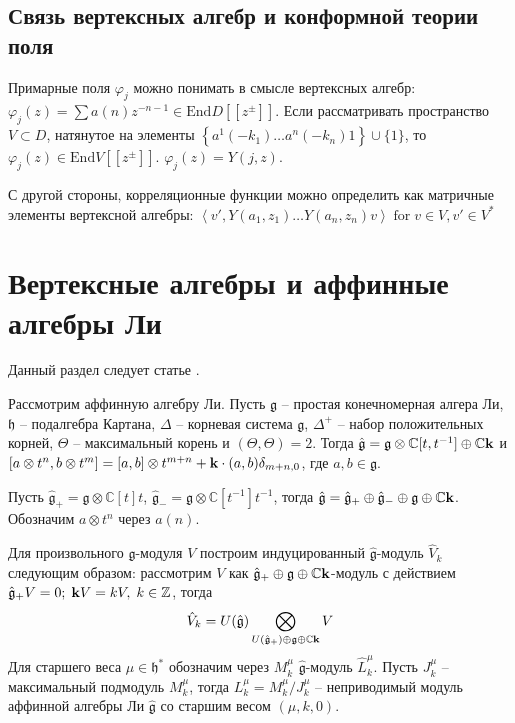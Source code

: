 \documentclass[12pt]{article}
\newcommand{\gf}{\mathfrak{g}}
\newcommand{\hf}{\mathfrak{h}}
\newcommand{\gfh}{\hat{\mathfrak{g}}}
\begin{document}
\subsection{Связь вертексных алгебр и конформной теории поля}
 Примарные поля
$\varphi_j$ можно понимать в смысле вертексных алгебр: $\varphi_j (z)
=  \sum a(n) z^{-n-1} \in \mathrm{End} D [[z^{\pm}]]$. Если
рассматривать пространство $V\subset D$, натянутое на элементы $\left\{a^1
(-k_1) \dots a^n (-k_n) 1 \right\} \cup \{1\}$, то $\varphi_j (z) \in
\mathrm{End} V [[z^{\pm}]]$. 
$\varphi_j (z) = Y(j,z)$.

С другой стороны, корреляционные функции можно определить как
матричные элементы вертексной алгебры: $\left<v',Y(a_1,z_1)\dots
  Y(a_n,z_n) v\right> \;\mbox{for}\; v\in V, v'\in V^*$

\section{Вертексные алгебры и аффинные алгебры Ли}
\label{sec:affine-lie-algebras}
Данный раздел следует статье \cite{frenkel1992vertex}.

Рассмотрим аффинную алгебру Ли. Пусть $\gf$ -- простая конечномерная
алгера Ли, $\hf$ -- подалгебра Картана, $\Delta$ -- корневая система
$\gf$, $\Delta^+$ -- набор положительных корней, $\Theta$ --
максимальный корень и $(\Theta,\Theta)=2$. 
Тогда $\gfh=\gf\otimes \mathbb{C} [t,t^{-1}]\oplus \mathbb{C}{\bf k}$
и $[a\otimes t^n, b\otimes t^m]=[a,b]\otimes t^{m+n} +{\bf k}\cdot
(a,b)\delta_{m+n,0}$, где $a,b\in \gf$. 

Пусть $\gfh_+=\gf\otimes \mathbb{C}[t]t$, $\gfh_- =\gf\otimes
\mathbb{C}[t^{-1}]t^{-1}$, тогда $\gfh=\gfh_+\oplus \gfh_- \oplus \gf\oplus
\mathbb{C}{\bf k}$. 
Обозначим $a\otimes t^n$ через $a(n)$.

Для произвольного $\gf$-модуля $V$ построим индуцированный $\gfh$-модуль $\hat{V}_k$ следующим
образом: рассмотрим $V$ как $\gfh_+ \oplus\gf\oplus \mathbb{C}{\bf k}$-модуль с
действием $\gfh_+ V=0; \; {\bf k} V=k V,\; k\in \mathbb{Z}$, тогда
\begin{equation}
  \label{eq:1}
  \hat{V}_k=U(\gfh) \bigotimes_{U(\gfh_+)\oplus \gf\oplus\mathbb{C}{\bf k}} V
\end{equation}
Для старшего веса $\mu\in \hf^* $ обозначим через $M^{\mu}_{k}$ $\gfh$-модуль
$\hat{L}^{\mu}_k$. Пусть $J^{\mu}_k$ -- максимальный подмодуль $M^{\mu}_k$,
тогда $L^{\mu}_k=M^{\mu}_k/J^{\mu}_k$ -- неприводимый модуль аффинной алгебры Ли
$\gfh$ со старшим весом $(\mu,k,0)$.
\end{document}
